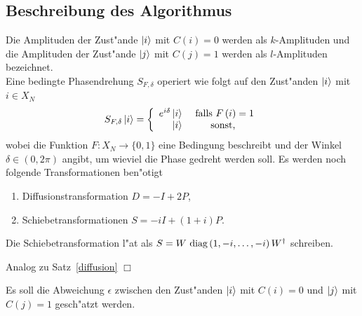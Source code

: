        \subsection{Beschreibung des Algorithmus}
         Die Amplituden der Zust"ande $\left| i \right>$ mit $C(i)=0$ werden als $k$-Amplituden und die Amplituden der Zust"ande $\left| j \right>$ mit $C(j)=1$ werden als
         $l$-Amplituden bezeichnet. \\
         \noindent
         Eine bedingte Phasendrehung $S_{F,\delta}$ operiert wie folgt auf den Zust"anden $\left| i \right>$ mit $i\in X_N$
         $$ S_{F,\delta} \left| i \right> = \left\{
                                     \begin{array}{rc}
                                       e^{i \delta}\left| i \right> & \mbox{ falls } F\left( i\right) = 1 \\
                                                   \left| i \right> & \mbox{ sonst, }
                                     \end{array}
                                   \right.
         $$
         wobei die Funktion $F:X_N \to \{0,1\}$ eine Bedingung beschreibt und der Winkel $\delta\in (0,2\pi )$ angibt, um wieviel die Phase gedreht werden soll. 
         Es werden noch folgende Transformationen ben"otigt
         \begin{enumerate}
           \item Diffusionstransformation $D=-I+2P$,
           \item Schiebetransformationen $S=-iI + (1+i)P$.
         \end{enumerate}
         \begin{lemma}[Schiebetransformation]
           Die Schiebetransformation l"a\3t als $S = W\mbox{ diag}\left(1,-i,\ldots,-i\right) W^{\dagger}$ schreiben.
         \end{lemma}
         \beweis Analog zu Satz~\ref{diffusion} \hfill $\Box$
         \begin{alg} Es soll die Abweichung $\epsilon$ zwischen den Zust"anden $\left| i \right>$ mit $C(i)=0$ und $\left| j \right>$ mit $C(j)=1$ 
           gesch"atzt werden.
         \end{alg}
